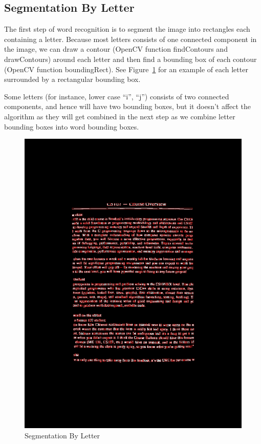 \documentclass[conference]{IEEEtran}
\begin{document}
\subsection{Segmentation By Letter}
The first step of word recognition is to segment the image into rectangles each containing a letter.  Because most letters consists of one connected component in the image, we can draw a contour (OpenCV function findContours and drawContours) around each letter and then find a bounding box of each contour (OpenCV function boundingRect). See Figure~\ref{letterbbox} for an example of each letter surrounded by a rectangular bounding box.

Some letters (for instance, lower case ``i'', ``j'') consists of two connected components, and hence will have two bounding boxes, but it doesn't affect the algorithm as they will get combined in the next step as we combine letter bounding boxes into word bounding boxes.  

\begin{figure}
\center
\includegraphics[scale=0.15]{letter_with_bounding_box.jpg}
\caption{Segmentation By Letter}
\label{letterbbox}
\end{figure}
\end{document}
